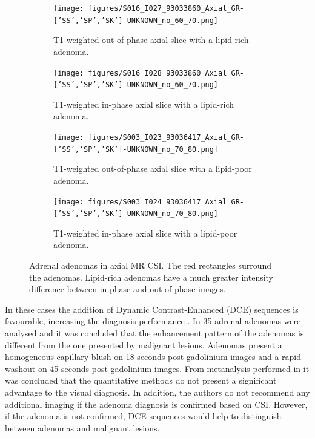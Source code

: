 \documentclass{article}
\begin{document}
\begin{figure}
    \centering
    \begin{subfigure}[b]{0.45\textwidth}
        \centering
        \texttt{[image: figures/S016\_I027\_93033860\_Axial\_GR-['SS','SP','SK']-UNKNOWN\_no\_60\_70.png]}
        \caption{T1-weighted out-of-phase axial slice with a lipid-rich adenoma.}
        \label{fig:adenoma_lr_OP}
    \end{subfigure}
    \hfill
    \begin{subfigure}[b]{0.45\textwidth}
        \centering
        \texttt{[image: figures/S016\_I028\_93033860\_Axial\_GR-['SS','SP','SK']-UNKNOWN\_no\_60\_70.png]}
        \caption{T1-weighted in-phase axial slice with a lipid-rich adenoma.}
        \label{fig:adenoma_lr_IP}
    \end{subfigure}
    \vfill
    \begin{subfigure}[b]{0.45\textwidth}
        \centering
        \texttt{[image: figures/S003\_I023\_93036417\_Axial\_GR-['SS','SP','SK']-UNKNOWN\_no\_70\_80.png]}
        \caption{T1-weighted out-of-phase axial slice with a lipid-poor adenoma.}
        \label{fig:adenoma_lp_OP}
    \end{subfigure}
    \hfill
    \begin{subfigure}[b]{0.45\textwidth}
        \centering
        \texttt{[image: figures/S003\_I024\_93036417\_Axial\_GR-['SS','SP','SK']-UNKNOWN\_no\_70\_80.png]}
        \caption{T1-weighted in-phase axial slice with a lipid-poor adenoma.}
        \label{fig:adenoma_lp_IP}
    \end{subfigure}
    \caption{Adrenal adenomas in axial MR CSI. The red rectangles surround the adenomas. Lipid-rich adenomas have a much greater intensity difference between in-phase and out-of-phase images.   }
    \label{fig:adenomas}
\end{figure}

In these cases the addition of Dynamic Contrast-Enhanced (DCE) sequences is
favourable, increasing the diagnosis performance \cite{Barat2022}. In
\cite{Chung2001} 35 adrenal adenomas were analysed and it was concluded that the
enhancement pattern of the adenomas is different from the one presented by
malignant lesions. Adenomas present a homogeneous capillary blush on 18 seconds
post-gadolinium images and a rapid washout on 45 seconds post-gadolinium images.
From metanalysis performed in \cite{Platzek2019} it was concluded that the
quantitative methods do not present a significant advantage to the visual
diagnosis. In addition, the authors do not recommend any additional imaging if
the adenoma diagnosis is confirmed based on CSI. However, if the adenoma is not
confirmed, DCE sequences would help to distinguish between adenomas and
malignant lesions.
\end{document}
